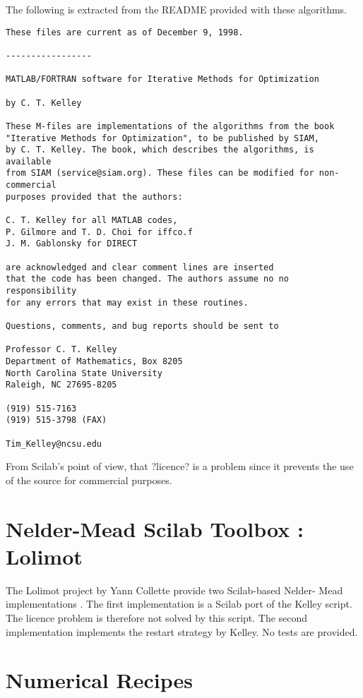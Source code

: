 The following is extracted from the README provided with these 
algorithms. 

\begin{verbatim}
These files are current as of December 9, 1998.

-----------------

MATLAB/FORTRAN software for Iterative Methods for Optimization

by C. T. Kelley

These M-files are implementations of the algorithms from the book
"Iterative Methods for Optimization", to be published by SIAM,
by C. T. Kelley. The book, which describes the algorithms, is available
from SIAM (service@siam.org). These files can be modified for non-commercial
purposes provided that the authors: 

C. T. Kelley for all MATLAB codes, 
P. Gilmore and T. D. Choi for iffco.f
J. M. Gablonsky for DIRECT

are acknowledged and clear comment lines are inserted
that the code has been changed. The authors assume no no responsibility
for any errors that may exist in these routines.

Questions, comments, and bug reports should be sent to

Professor C. T. Kelley
Department of Mathematics, Box 8205
North Carolina State University
Raleigh, NC 27695-8205

(919) 515-7163
(919) 515-3798 (FAX)

Tim_Kelley@ncsu.edu

\end{verbatim}


From Scilab's point of view, that ?licence? is a problem since it 
prevents the use of the source for commercial purposes.

\section{Nelder-Mead Scilab Toolbox : Lolimot}

The Lolimot project by Yann Collette provide two Scilab-based Nelder-
Mead implementations \cite{LolimotColletteURL}. The first implementation is a Scilab port of 
the Kelley script. The licence problem is therefore not solved by this 
script. The second implementation \cite{NelderMeadColletteURL} implements the restart strategy 
by Kelley. No tests are provided.

\section{Numerical Recipes}


